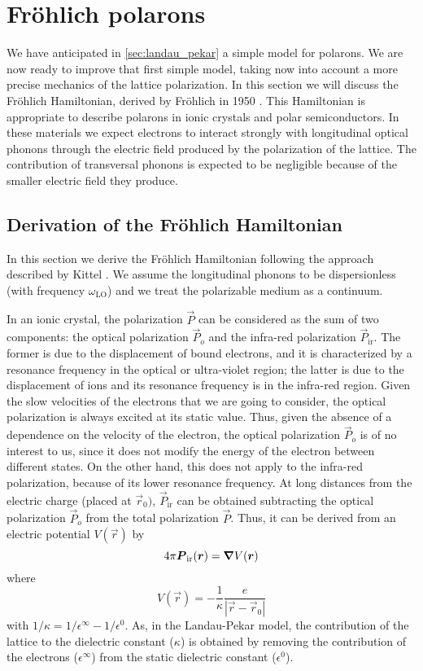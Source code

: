 \section{Fr\"{o}hlich polarons}
We have anticipated in \cref{sec:landau_pekar} a simple model for polarons. We are now ready to improve that first simple model, taking now into account a more precise mechanics of the lattice polarization. In this section we will discuss the Fr\"ohlich Hamiltonian, derived by Fr\"{o}hlich in 1950 \cite{frohlich1950}. This Hamiltonian is appropriate to describe polarons in ionic crystals and polar semiconductors. In these materials we expect electrons to interact strongly with longitudinal optical phonons through the electric field produced by the polarization of the lattice. The contribution of transversal phonons is expected to be negligible because of the smaller electric field they produce.

\subsection{Derivation of the Fr\"{o}hlich Hamiltonian}
In this section we derive the Fr\"{o}hlich Hamiltonian following the approach described by Kittel \cite{kittel1987}. We assume the longitudinal phonons to be dispersionless (with frequency $\omega_\text{LO}$) and we treat the polarizable medium as a continuum.

In an ionic crystal, the polarization $\vec{P}$ can be considered as the sum of two components: the optical polarization $\vec{P}_o$ and the infra-red polarization $\vec{P}_\text{ir}$. The former is due to the displacement of bound electrons, and it is characterized by a resonance frequency in the optical or ultra-violet region; the latter is due to the displacement of ions and its resonance frequency is in the infra-red region. Given the slow velocities of the electrons that we are going to consider, the optical polarization is always excited at its static value. Thus, given the absence of a dependence on the velocity of the electron, the optical polarization $\vec{P}_o$ is of no interest to us, since it does not modify the energy of the electron between different states. On the other hand, this does not apply to the infra-red polarization, because of its lower resonance frequency. At long distances from the electric charge (placed at $\vec{r}_0)$, $\vec{P}_\text{ir}$ can be obtained subtracting the optical polarization $\vec{P}_o$ from the total polarization $\vec{P}$. Thus, it can be derived from an electric potential $V(\vec{r})$ by
\begin{equation} \label{eq:polarization_potential}
    4\pi\mathbf{\boldsymbol{P}}_\text{ir}(\mathbf{\boldsymbol{r}}) = \grad V(\mathbf{\boldsymbol{r}})
\end{equation}
where
\begin{equation}
    V(\vec{r}) = -\frac{1}{\kappa} \frac{e}{|\vec{r}-\vec{r}_0|}
\end{equation}
with $1/\kappa = 1 / \epsilon^\infty - 1/\epsilon^0$. As, in the Landau-Pekar model, the contribution of the lattice to the dielectric constant ($\kappa$) is obtained by removing the contribution of the electrons ($\epsilon^\infty$) from the static dielectric constant ($\epsilon^0$).


